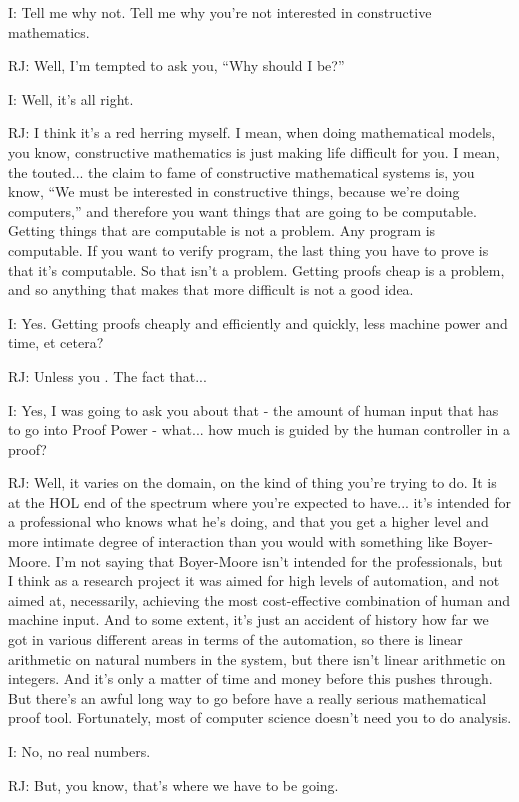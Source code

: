\documentclass[10pt,titlepage]{book}
\begin{document}
I: Tell me why not.
Tell me why you're not interested in constructive mathematics.

RJ: Well, I'm tempted to ask you, ``Why should I be?''

I: Well, it's all right.

RJ: I think it's a red herring myself. I mean, when doing mathematical models, you know, constructive mathematics is just making life difficult for you. I mean, the touted... the claim to fame of constructive mathematical systems is, you know, ``We must be interested in constructive things, because we're doing computers,'' and therefore you want things that are going to be computable. Getting things that are computable is not a problem. Any program is computable. If you want to verify program, the last thing you have to prove is that it's computable. So that isn't a problem. Getting proofs cheap is a problem, and so anything that makes that more difficult is not a good idea.

I: Yes. Getting proofs cheaply and efficiently and quickly, less machine power and time, et cetera?

RJ: Unless you	. The fact that...

I: Yes, I was going to ask you about that - the amount of human input that has to go into Proof Power - what... how much is guided by the human controller in a proof?

RJ: Well, it varies on the domain, on the kind of thing you're trying to do. It is at the HOL end of the spectrum where you're expected to have... it's intended for a professional who knows what he's doing, and that you get a higher level and more intimate degree of interaction than you would with something like Boyer-Moore. I'm not saying that Boyer-Moore isn't intended for the professionals, but I think as a research project it was aimed for high levels of automation, and not aimed at, necessarily, achieving the most cost-effective combination of human and machine input. And to some extent, it's just an accident of history how far we got in various different areas in terms of the automation, so there is linear arithmetic on natural numbers in the system, but there isn't linear arithmetic on integers. And it's only a matter of time and money before this pushes through. But there's an awful long way to go before have a really serious mathematical proof tool. Fortunately, most of computer science doesn't need you to do analysis.

I: No, no real numbers.

RJ: But, you know, that's where we have to be going.
\end{document}
